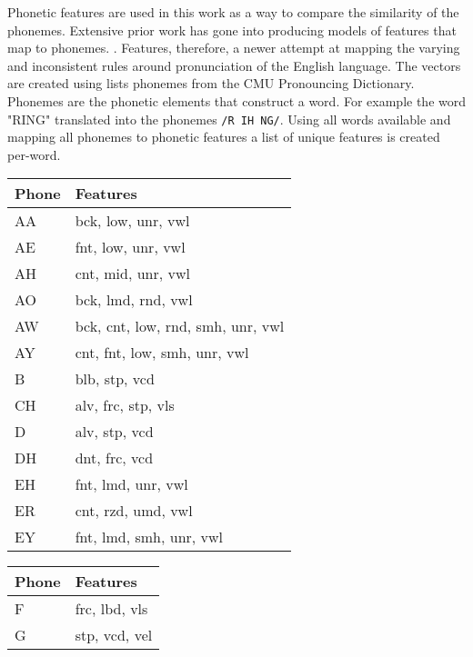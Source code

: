 Phonetic features are used in this work as a way to compare the similarity of the phonemes. Extensive prior work has gone into producing models of features that map to phonemes. \cite{chomsky1968sound}\cite{ladefoged1969measurement}\cite{bradlow2010perceptual}. Features, therefore, a newer attempt at mapping the varying and inconsistent rules around pronunciation of the English language. The vectors are created using lists phonemes from the CMU Pronouncing Dictionary. Phonemes are the phonetic elements that construct a word. For example the word "RING" translated into the phonemes \verb|/R IH NG/|. Using all words available and mapping all phonemes to phonetic features a list of unique features is created per-word.

\begin{table}[!htb]
    \tiny
    \begin{minipage}{.33\linewidth}
        \centering
        \begin{tabular}{ll}
            Phone & Features \\
            \hline
            AA & bck, low, unr, vwl \\
            AE & fnt, low, unr, vwl \\
            AH & cnt, mid, unr, vwl \\
            AO & bck, lmd, rnd, vwl \\
            AW & bck, cnt, low, rnd, smh, unr, vwl \\
            AY & cnt, fnt, low, smh, unr, vwl \\
            B & blb, stp, vcd \\
            CH & alv, frc, stp, vls \\
            D & alv, stp, vcd \\
            DH & dnt, frc, vcd \\
            EH & fnt, lmd, unr, vwl \\
            ER & cnt, rzd, umd, vwl \\
            EY & fnt, lmd, smh, unr, vwl
        \end{tabular}
    \end{minipage}%
    \begin{minipage}{.33\linewidth}
        \centering
        \begin{tabular}{ll}
            Phone & Features \\
            \hline
            F &  frc, lbd, vls \\
            G &  stp, vcd, vel \\

\end{tabular}
\end{minipage}
\end{table}

